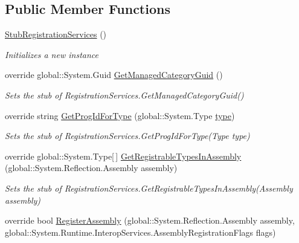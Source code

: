 \subsection*{Public Member Functions}
\begin{DoxyCompactItemize}
\item 
\hyperlink{class_system_1_1_runtime_1_1_interop_services_1_1_fakes_1_1_stub_registration_services_a47bcdf2ccba535e0f220721c56b77de6}{Stub\-Registration\-Services} ()
\begin{DoxyCompactList}\small\item\em Initializes a new instance\end{DoxyCompactList}\item 
override global\-::\-System.\-Guid \hyperlink{class_system_1_1_runtime_1_1_interop_services_1_1_fakes_1_1_stub_registration_services_ab7608cd581d3291e4e2829f11ce4c46e}{Get\-Managed\-Category\-Guid} ()
\begin{DoxyCompactList}\small\item\em Sets the stub of Registration\-Services.\-Get\-Managed\-Category\-Guid()\end{DoxyCompactList}\item 
override string \hyperlink{class_system_1_1_runtime_1_1_interop_services_1_1_fakes_1_1_stub_registration_services_ae5e096d7c7bea133fc76caf8d3eecb07}{Get\-Prog\-Id\-For\-Type} (global\-::\-System.\-Type \hyperlink{jquery-1_810_82-vsdoc_8js_a3940565e83a9bfd10d95ffd27536da91}{type})
\begin{DoxyCompactList}\small\item\em Sets the stub of Registration\-Services.\-Get\-Prog\-Id\-For\-Type(\-Type type)\end{DoxyCompactList}\item 
override global\-::\-System.\-Type\mbox{[}$\,$\mbox{]} \hyperlink{class_system_1_1_runtime_1_1_interop_services_1_1_fakes_1_1_stub_registration_services_a9f078c879165a076bcd141f13048b87f}{Get\-Registrable\-Types\-In\-Assembly} (global\-::\-System.\-Reflection.\-Assembly assembly)
\begin{DoxyCompactList}\small\item\em Sets the stub of Registration\-Services.\-Get\-Registrable\-Types\-In\-Assembly(\-Assembly assembly)\end{DoxyCompactList}\item 
override bool \hyperlink{class_system_1_1_runtime_1_1_interop_services_1_1_fakes_1_1_stub_registration_services_a88d9c0dba5594e17ec6ab66f445a562f}{Register\-Assembly} (global\-::\-System.\-Reflection.\-Assembly assembly, global\-::\-System.\-Runtime.\-Interop\-Services.\-Assembly\-Registration\-Flags flags)

\end{DoxyCompactItemize}
